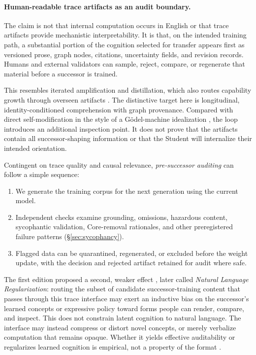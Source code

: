 \documentclass[11pt]{article}
\begin{document}
					\paragraph{Human-readable trace artifacts as an audit boundary.} The claim is not that internal computation occurs in English or that trace artifacts provide mechanistic interpretability. It is that, on the intended training path, a substantial portion of the cognition selected for transfer appears first as versioned prose, graph nodes, citations, uncertainty fields, and revision records. Humans and external validators can sample, reject, compare, or regenerate that material before a successor is trained.

			This resembles iterated amplification and distillation, which also routes capability growth through overseen artifacts \cite{christiano2018amplification}. The distinctive target here is longitudinal, identity-conditioned comprehension with graph provenance. Compared with direct self-modification in the style of a Gödel-machine idealization \cite{schmidhuber2006goedelmachinesselfreferentialuniversal}, the loop introduces an additional inspection point. It does not prove that the artifacts contain all successor-shaping information or that the Student will internalize their intended orientation.

			Contingent on trace quality and causal relevance, \emph{pre-successor auditing} can follow a simple sequence:
			\begin{enumerate}
				\item We generate the training corpus for the next generation using the current model.
				\item Independent checks examine grounding, omissions, hazardous content, sycophantic validation, Core-removal rationales, and other preregistered failure patterns (\S\ref{sec:sycophancy}).
				\item Flagged data can be quarantined, regenerated, or excluded before the weight update, with the decision and rejected artifact retained for audit where safe.
			\end{enumerate}

			The first edition proposed a second, weaker effect
			\cite{westerberg2025superintelligence}, later called
			\emph{Natural Language Regularization}: routing the subset of candidate
			successor-training content that passes through this trace interface may
			exert an inductive bias on the successor's learned concepts or expressive
			policy toward forms people can render, compare, and inspect. This does not
			constrain latent cognition to natural language. The interface may instead
			compress or distort novel concepts, or merely verbalize computation that
			remains opaque. Whether it yields effective auditability or regularizes
			learned cognition is empirical, not a property of the format
			\cite{westerberg2026entangled}.
\end{document}

